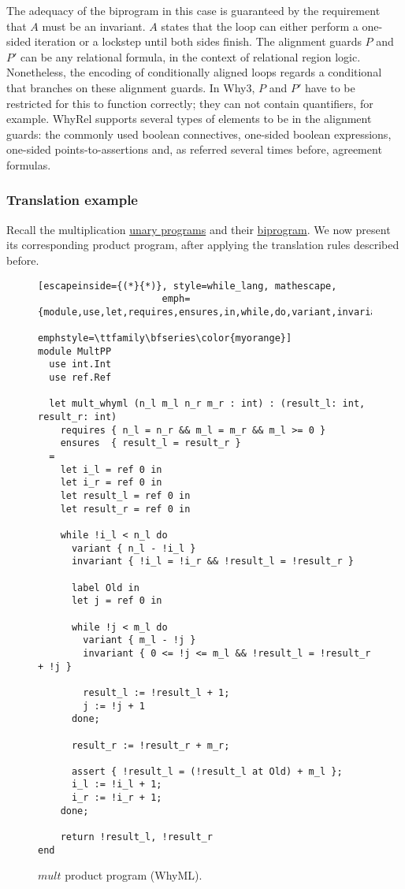 The adequacy of the biprogram in this case is guaranteed by the requirement that $A$ must be an invariant.
$A$ states that the loop can either perform a one-sided iteration or a lockstep until both sides finish.
The alignment guards $P$ and $P'$ can be any relational formula, in the context of relational region logic.
Nonetheless, the encoding of conditionally aligned loops regards a conditional that branches on these alignment guards.
In Why3, $P$ and $P'$ have to be restricted for this to function correctly; they can not contain quantifiers, for example.
WhyRel supports several types of elements to be in the alignment guards: the commonly used boolean connectives, one-sided boolean expressions, one-sided points-to-assertions and, as referred several times before, agreement formulas.


\subsubsection{Translation example}
\label{subsubsec:whyrel_translation_example}

Recall the multiplication \hyperref[fig:mult_source_programs]{unary programs} and their \hyperref[fig:mult_biprogram]{biprogram}.
We now present its corresponding product program, after applying the translation rules described before.

\begin{figure}[h]
  \centering
  \noindent
  \begin{lstlisting}[escapeinside={(*}{*)}, style=while_lang, mathescape,
                      emph={module,use,let,requires,ensures,in,while,do,variant,invariant,done,return,label,end,assert,at},
                      emphstyle=\ttfamily\bfseries\color{myorange}]
module MultPP
  use int.Int
  use ref.Ref

  let mult_whyml (n_l m_l n_r m_r : int) : (result_l: int, result_r: int)
    requires { n_l = n_r && m_l = m_r && m_l >= 0 }
    ensures  { result_l = result_r }
  =
    let i_l = ref 0 in
    let i_r = ref 0 in
    let result_l = ref 0 in
    let result_r = ref 0 in

    while !i_l < n_l do
      variant { n_l - !i_l }
      invariant { !i_l = !i_r && !result_l = !result_r }

      label Old in
      let j = ref 0 in
      
      while !j < m_l do
        variant { m_l - !j }
        invariant { 0 <= !j <= m_l && !result_l = !result_r + !j }

        result_l := !result_l + 1;
        j := !j + 1
      done;

      result_r := !result_r + m_r;

      assert { !result_l = (!result_l at Old) + m_l };
      i_l := !i_l + 1;
      i_r := !i_r + 1;
    done;
    
    return !result_l, !result_r
end
  \end{lstlisting}
  \caption{$mult$ product program (WhyML).}
  \label{fig:translation_ex}
\end{figure}

